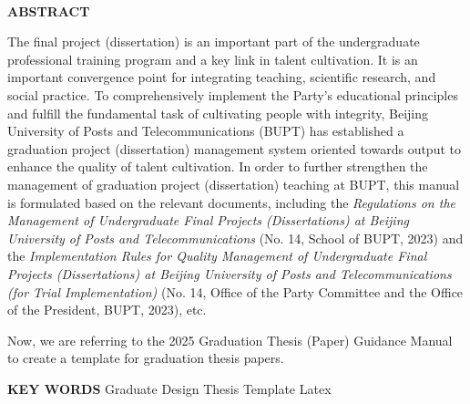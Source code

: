 \documentclass[../main.tex]{subfiles}
\begin{document}
\begin{titlepage}

    \pagestyle{empty}

    \begin{spacing}{1.05}
        \centering
        \parbox[c]{.75\textwidth}{
          \centering
          \textbf{\thesisenglishtitle}
        }
    \end{spacing}

    \begin{spacing}{1.5}
        \centering
        \quad \\ 
        \textbf{ABSTRACT} \\ 
    \end{spacing}
    \quad

    \normalsize

    The final project (dissertation) is an important part of the undergraduate professional training program and a key link in talent cultivation. It is an important convergence point for integrating teaching, scientific research, and social practice. To comprehensively implement the Party's educational principles and fulfill the fundamental task of cultivating people with integrity, Beijing University of Posts and Telecommunications (BUPT) has established a graduation project (dissertation) management system oriented towards output to enhance the quality of talent cultivation. In order to further strengthen the management of graduation project (dissertation) teaching at BUPT, this manual is formulated based on the relevant documents, including the \textit{Regulations on the Management of Undergraduate Final Projects (Dissertations) at Beijing University of Posts and Telecommunications} (No. 14, School of BUPT, 2023) and the \textit{Implementation Rules for Quality Management of Undergraduate Final Projects (Dissertations) at Beijing University of Posts and Telecommunications (for Trial Implementation)} (No. 14, Office of the Party Committee and the Office of the President, BUPT, 2023), etc. 

    Now, we are referring to the 2025 Graduation Thesis (Paper) Guidance Manual to create a template for graduation thesis papers.

    \quad{}

    \par\noindent{}\textbf{KEY WORDS}\quad{}%
    {
      Graduate Design\quad
      Thesis Template\quad
      Latex\quad
    }

\end{titlepage}

\thispagestyle{empty}
\end{document}
